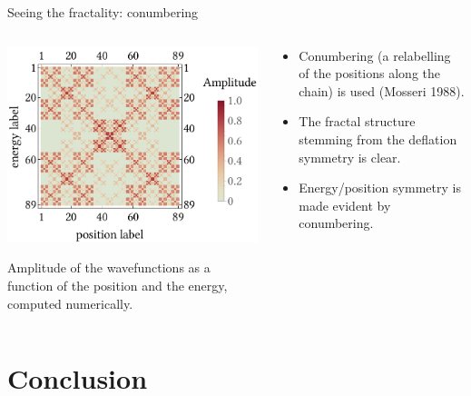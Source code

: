 \documentclass[xcolor=x11names,compress,professionalfonts]{beamer}
\renewcommand{\(}{\begin{columns}}
\renewcommand{\)}{\end{columns}}
\newcommand{\<}[1]{\begin{column}{#1}}
\renewcommand{\>}{\end{column}}
\begin{document}
\begin{frame}{Seeing the fractality: conumbering}
\begin{columns}
	\begin{column}{7cm}
		\centering
		\includegraphics[scale=.55]{ldos_reordered.pdf}
		
		\scriptsize{Amplitude of the wavefunctions as a function of the position and the energy, computed numerically.}	
	\end{column}
	\begin{column}{5cm}
		\begin{itemize}
			\item Conumbering (a relabelling of the positions along the chain) is used (Mosseri 1988).
			\item The fractal structure stemming from the deflation symmetry is clear.
			\item Energy/position symmetry is made evident by conumbering.
		\end{itemize}
	\end{column}
\end{columns}
\end{frame}

\section{Conclusion}
\end{document}
